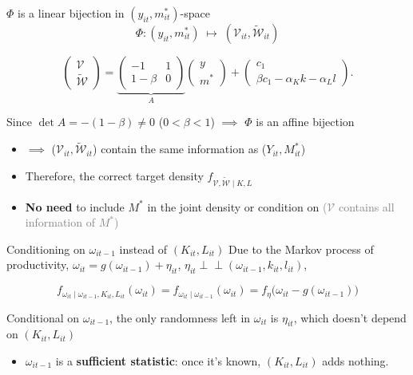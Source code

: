 \documentclass[
  ignorenonframetext,
  aspectratio=169,
]{beamer}
\providecommand{\tightlist}{%
  \setlength{\itemsep}{0pt}\setlength{\parskip}{0pt}}
\newcommand{\sm}[1]{\textcolor{gray}{\footnotesize #1}} %
\newcommand{\ind}{{\perp\!\!\!\perp}}
\begin{document}
\begin{frame}{\(\Phi\) is a linear bijection in
\((y_{it},m^*_{it})\)-space}
\protect{}\label{phi-is-a-linear-bijection-in-y_itm_it-space}
\[
\Phi:(y_{it},m^*_{it})\;\mapsto\;(\mathcal V_{it},\tilde{\mathcal W}_{it})
\]

\[
\begin{pmatrix}\mathcal V\\ \tilde{\mathcal W}\end{pmatrix}
=\underbrace{\begin{pmatrix}-1 & 1\\ 1-\beta & 0\end{pmatrix}}_{A}
\begin{pmatrix}y\\ m^*\end{pmatrix}
+\begin{pmatrix}c_1\\ \beta c_1-\alpha_Kk-\alpha_Ll\end{pmatrix}.
\]

Since \(\det A = -(1-\beta)\ne0\) (\(0<\beta<1\)) \(\implies\) \(\Phi\)
is an affine bijection

\begin{itemize}
\item
  \(\implies\) (\(\mathcal{V}_{it},\tilde{\mathcal{W}}_{it}\)) contain
  the same information as (\(Y_{it},M^*_{it}\))
\item
  Therefore, the correct target density
  \(f_{\mathcal V,\tilde{\mathcal W}\mid K,L}\)
\item
  \textbf{No need} to include \(M^*\) in the joint density or condition
  on \sm{(\(\mathcal{V}\) contains all information of \(M^*\))}
\end{itemize}
\end{frame}

\begin{frame}{Conditioning on \(\omega_{it-1}\) instead of
\((K_{it},L_{it})\)}
\protect{}\label{conditioning-on-omega_it-1-instead-of-k_itl_it}
Due to the Markov process of productivity,
\(\omega_{it}=g(\omega_{it-1})+\eta_{it}\),
\(\eta_{it}\ind(\omega_{it-1},k_{it},l_{it})\),

\[
f_{\omega_{it}\mid \omega_{it-1},K_{it},L_{it}}(\omega_{it})=f_{\omega_{it}\mid \omega_{it-1}}(\omega_{it})=f_\eta\big(\omega_{it}-g(\omega_{it-1})\big)
\]

Conditional on \(\omega_{it-1}\), the only randomness left in
\(\omega_{it}\) is \(\eta_{it}\), which doesn't depend on
\((K_{it},L_{it})\)

\begin{itemize}
\tightlist
\item
  \(\omega_{it-1}\) is a \textbf{sufficient statistic}: once it's known,
  \((K_{it},L_{it})\) adds nothing.
\end{itemize}
\end{frame}
\end{document}
